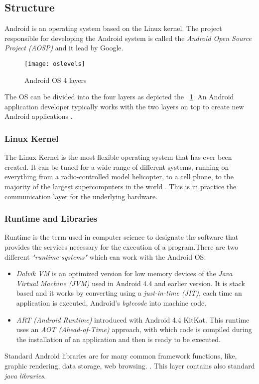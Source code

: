 \subsection{Structure}
\par
Android is an operating system based on the Linux kernel. The project responsible for developing the Android system is called the \textit{Android Open Source Project (AOSP)} and it lead by Google.
\begin{figure}[h]
	\centering
	\texttt{[image: oslevels]}
	\caption{Android OS 4 layers}
	\label{fig:2.3}
\end{figure}

The OS can be divided into the four layers as depicted the \figurename~\ref{fig:2.3}. An Android application developer typically works with the two layers on top to create new Android applications \cite{vogel2016android}.

\subsubsection{Linux Kernel} 
The Linux Kernel is the most flexible operating system that has ever been created. It can be tuned for a wide range of different systems, running on everything from a radio-controlled model helicopter, to a cell phone, to the majority of the largest supercomputers in the world \cite{hartman2006linux}. This is in practice the communication layer for the underlying hardware.
\subsubsection{Runtime and Libraries}
Runtime is the term used in computer science to designate the software that provides the services necessary for the execution of a program.There are two different \textit{"runtime systems"} which can work with the Android OS:
\begin{itemize}
	\item \textit{Dalvik VM} is an optimized version for low memory devices of the \textit{Java Virtual Machine (JVM)} used in Android 4.4 and earlier version. It is stack based and it works by converting using a \textit{just-in-time (JIT)}, each time an application is executed, Android's \textit{bytecode} into machine code.
	\item \textit{ART (Android Runtime)} introduced with Android 4.4 KitKat. This runtime uses an \textit{AOT (Ahead-of-Time)} approach, with which code is compiled during the installation of an application and then is ready to be executed.
\end{itemize}
\par Standard Android libraries are for many common framework functions, like, graphic rendering, data storage, web browsing. \cite{vogel2016android}. This layer contains also standard \textit{java libraries}.
